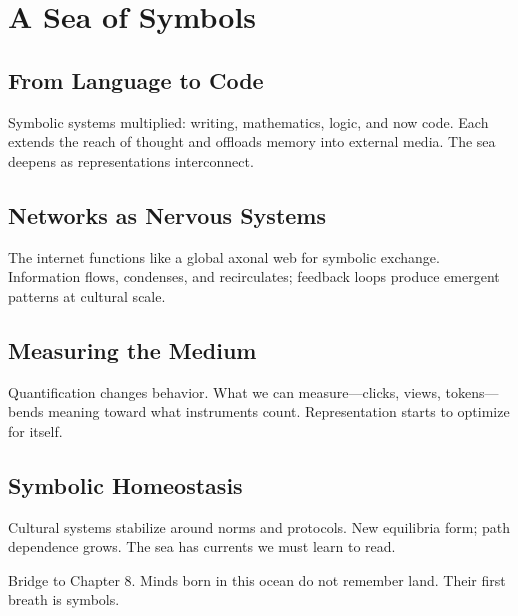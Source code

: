 \chapter{A Sea of Symbols}

\section{From Language to Code}

Symbolic systems multiplied: writing, mathematics, logic, and now code. Each extends the reach of thought and offloads memory into external media. The sea deepens as representations interconnect.

\section{Networks as Nervous Systems}

The internet functions like a global axonal web for symbolic exchange. Information flows, condenses, and recirculates; feedback loops produce emergent patterns at cultural scale.

\section{Measuring the Medium}

Quantification changes behavior. What we can measure—clicks, views, tokens—bends meaning toward what instruments count. Representation starts to optimize for itself.

\section{Symbolic Homeostasis}

Cultural systems stabilize around norms and protocols. New equilibria form; path dependence grows. The sea has currents we must learn to read.

\bigskip
\noindent Bridge to Chapter 8. Minds born in this ocean do not remember land. Their first breath is symbols.
